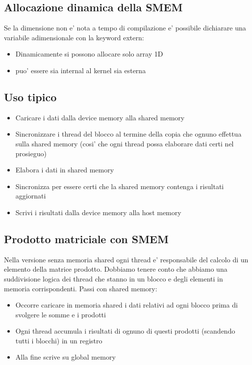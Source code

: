 \subsection{Allocazione dinamica della SMEM}
Se la dimensione non e' nota a tempo di compilazione e' possibile dichiarare una variabile adimensionale con la keyword extern:
\begin{itemize}
    \item Dinamicamente si possono allocare solo array 1D
    \item puo' essere sia internal al kernel sia esterna
\end{itemize}

\subsection{Uso tipico}
\begin{itemize}
    \item Caricare i dati dalla device memory alla shared memory
    \item Sincronizzare i thread del blocco al termine della copia che ognuno effettua sulla shared memory (cosi' che ogni thread possa elaborare dati certi nel prosieguo)
    \item Elabora i dati in shared memory
    \item Sincronizza per essere certi che la shared memory contenga i risultati aggiornati
    \item Scrivi i risultati dalla device memory alla host memory
\end{itemize}

\subsection{Prodotto matriciale con SMEM}
Nella versione senza memoria shared ogni thread e' responsabile del calcolo di un elemento della matrice prodotto. Dobbiamo tenere conto che abbiamo una suddivisione logica dei thread che stanno in un blocco e degli elementi in memoria corrispondenti.
Passi con shared memory:
\begin{itemize}
    \item Occorre caricare in memoria shared i dati relativi ad ogni blocco prima di svolgere le somme e i prodotti
    \item Ogni thread accumula i risultati di ognuno di questi prodotti (scandendo tutti i blocchi) in un registro
    \item Alla fine scrive su global memory
\end{itemize}

